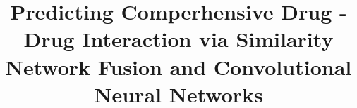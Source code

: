 \documentclass{bmcart}
\begin{document}
\begin{frontmatter}

\begin{fmbox}


\title{Predicting Comperhensive Drug - Drug Interaction via Similarity Network Fusion and Convolutional Neural Networks}

\author[
  addressref={aff1,aff2},
  email={khodamoradi1992@gmail.com}
]{ }
\author[
  addressref={aff1,aff2},
  email={Bahar.levian@gmail.com}
]{ }
\author[
  addressref={aff1,aff2},                   %
  corref={aff1},                       %
  email={eslahchi.ch@gmail.com}   %
]{ }



\address[id=aff1]{%
  ,             %
  ,
  ,          %
  ,                              %
}
\address[id=aff2]{%
  ,
  ,
  ,                              %
}


\end{fmbox}
\end{frontmatter}
\end{document}

